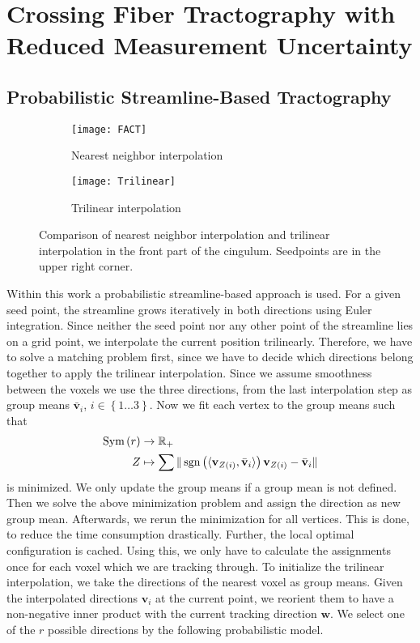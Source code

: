 \section{Crossing Fiber Tractography with Reduced Measurement Uncertainty}

\subsection{Probabilistic Streamline-Based Tractography}
\begin{figure*}[h]
	\centering
	\begin{subfigure}[b]{0.45\linewidth}
		\texttt{[image: FACT]}
		\caption{Nearest neighbor interpolation}
	\end{subfigure}
	\begin{subfigure}[b]{0.45\linewidth}
		\texttt{[image: Trilinear]}
		\caption{Trilinear interpolation}
	\end{subfigure}
	\caption{Comparison of nearest neighbor interpolation and trilinear
	interpolation in the front part of the cingulum. Seedpoints are in the
upper right corner.}

	\label{fig:interpolation-comparison}
\end{figure*}
Within this work a probabilistic streamline-based approach is used. For a given
seed point, the streamline grows iteratively in both directions using Euler
integration. Since neither the seed point nor any other point of the streamline
lies on a grid point, we interpolate the current position trilinearly. Therefore,
we have to solve a matching problem first, since we have to decide which
directions belong together to apply the trilinear interpolation. Since we assume
smoothness between the voxels we use the three directions, from the last
interpolation step as group means $\bar{\mathbf{v}}_i$, $i \in \left\{ 1\dots 3 
\right\}$. Now we fit each vertex to the group means such
that 
\begin{align}
	\text{Sym} \left( r  \right) & \rightarrow \mathbb{R}_+ \\ 
	Z & \mapsto \sum \| \operatorname*{sgn} \left( \langle \mathbf{v}_{Z \left( i \right)}
	, \bar{\mathbf{v}}_i \rangle  \right) \mathbf{v}_{Z \left( i \right)} -
\bar{\mathbf{v}}_i
	\|
\end{align}
is minimized. We only update the group means if a group mean is not defined.
Then we solve the above minimization problem and assign the direction as new
group mean. Afterwards, we rerun the minimization for all vertices. This is done,
to reduce the time consumption drastically. Further, the local optimal
configuration is cached. Using this, we only have to calculate the assignments
once for each voxel which we are tracking through. 
To initialize the trilinear interpolation, we take the directions of the nearest voxel as group means.
Given the interpolated directions $\mathbf{v}_i$ at the current point, we
reorient them to have a non-negative inner product with the current tracking
direction $\mathbf{w}$. We select one of the $r$ possible directions by the
following probabilistic model.

